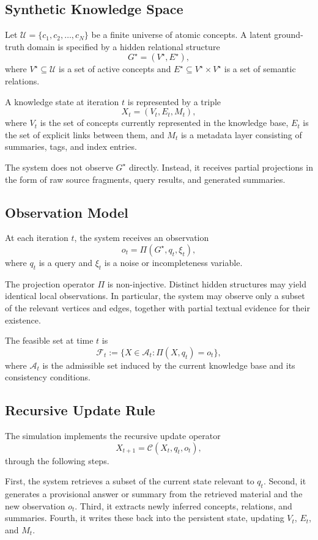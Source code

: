 \documentclass[12pt, oneside]{article}
\theoremstyle{plain}
\theoremstyle{definition}
\theoremstyle{remark}
\begin{document}
\subsection{Synthetic Knowledge Space}

Let $\mathcal{U} = \{c_1, c_2, \dots, c_N\}$ be a finite universe of atomic concepts. A latent ground-truth domain is specified by a hidden relational structure
\[
G^\star = (V^\star, E^\star),
\]
where $V^\star \subseteq \mathcal{U}$ is a set of active concepts and $E^\star \subseteq V^\star \times V^\star$ is a set of semantic relations.

A knowledge state at iteration $t$ is represented by a triple
\[
X_t = (V_t, E_t, M_t),
\]
where $V_t$ is the set of concepts currently represented in the knowledge base, $E_t$ is the set of explicit links between them, and $M_t$ is a metadata layer consisting of summaries, tags, and index entries.

The system does not observe $G^\star$ directly. Instead, it receives partial projections in the form of raw source fragments, query results, and generated summaries.

\subsection{Observation Model}

At each iteration $t$, the system receives an observation
\[
o_t = \Pi(G^\star, q_t, \xi_t),
\]
where $q_t$ is a query and $\xi_t$ is a noise or incompleteness variable.

The projection operator $\Pi$ is non-injective. Distinct hidden structures may yield identical local observations. In particular, the system may observe only a subset of the relevant vertices and edges, together with partial textual evidence for their existence.

The feasible set at time $t$ is
\[
\mathcal{F}_t := \{ X \in \mathcal{A}_t : \Pi(X, q_t) = o_t \},
\]
where $\mathcal{A}_t$ is the admissible set induced by the current knowledge base and its consistency conditions.

\subsection{Recursive Update Rule}

The simulation implements the recursive update operator
\[
X_{t+1} = \mathcal{C}(X_t, q_t, o_t),
\]
through the following steps.

First, the system retrieves a subset of the current state relevant to $q_t$. Second, it generates a provisional answer or summary from the retrieved material and the new observation $o_t$. Third, it extracts newly inferred concepts, relations, and summaries. Fourth, it writes these back into the persistent state, updating $V_t$, $E_t$, and $M_t$.
\end{document}
